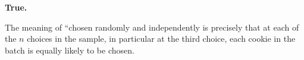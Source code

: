 
\begin{solution}
\textbf{True.}

 The meaning of ``chosen randomly and independently is precisely that
 at each of the $n$ choices in the sample, in particular at the third
 choice, each cookie in the batch is equally likely to be chosen.
\end{solution}

\documentclass[problem]{mcs}

\begin{pcomments}
\end{pcomments}



